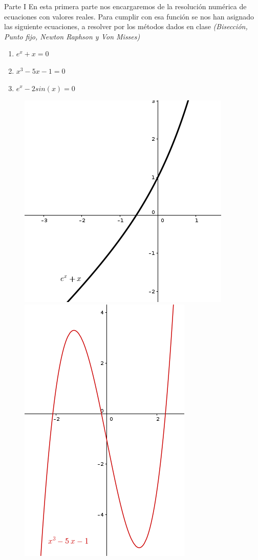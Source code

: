 \documentclass[legalpaper, 12pt]{article}
\def \eqa {\(e^x + x = 0\)}
\def \eqb {\(x^3 - 5x - 1 = 0\)}
\def \eqc {\(e^x - 2sin(x) = 0\)}
\begin{document}
  \begin{section}{Parte I}
    En esta primera parte nos encargaremos de la resolución numérica de ecuaciones con valores reales. Para cumplir con esa función se nos han asignado las siguiente ecuaciones, a resolver por los métodos dados en clase \textit{(Bisección, Punto fijo, Newton Raphson y Von Misses)}
    \begin{enumerate}
      \item \eqa
      \item \eqb
      \item \eqc
    \end{enumerate}
    \begin{figure}[h]
      \centering
      \includegraphics[scale=0.8]{eq1}
      \includegraphics[scale=0.8]{eq2}

\end{figure}
\end{section}
\end{document}
